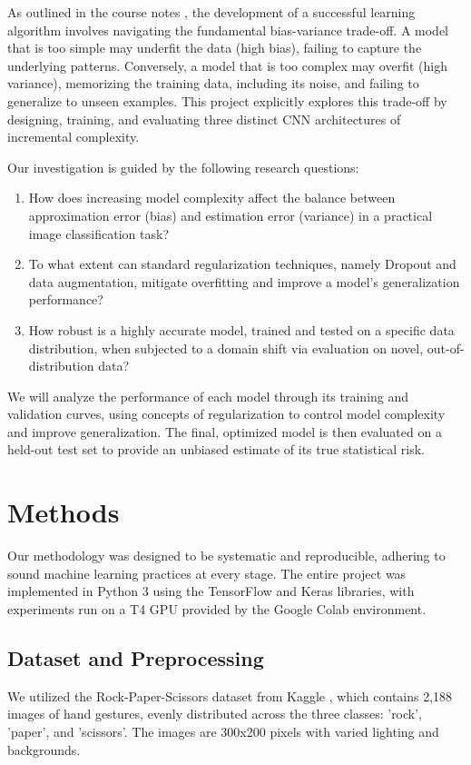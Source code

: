 \documentclass[pdflatex,sn-mathphys-num]{sn-jnl}%
\theoremstyle{thmstyleone}%
\theoremstyle{thmstyletwo}%
\theoremstyle{thmstylethree}%
\begin{document}
As outlined in the course notes \cite{cesa2024smml}, the development of a successful learning algorithm involves navigating the fundamental bias-variance trade-off. A model that is too simple may underfit the data (high bias), failing to capture the underlying patterns. Conversely, a model that is too complex may overfit (high variance), memorizing the training data, including its noise, and failing to generalize to unseen examples. This project explicitly explores this trade-off by designing, training, and evaluating three distinct CNN architectures of incremental complexity. 

Our investigation is guided by the following research questions:
\begin{enumerate}
    \item How does increasing model complexity affect the balance between approximation error (bias) and estimation error (variance) in a practical image classification task?
    \item To what extent can standard regularization techniques, namely Dropout and data augmentation, mitigate overfitting and improve a model's generalization performance?
    \item How robust is a highly accurate model, trained and tested on a specific data distribution, when subjected to a domain shift via evaluation on novel, out-of-distribution data?
\end{enumerate}

We will analyze the performance of each model through its training and validation curves, using concepts of regularization to control model complexity and improve generalization. The final, optimized model is then evaluated on a held-out test set to provide an unbiased estimate of its true statistical risk.

\section{Methods}\label{sec11}

Our methodology was designed to be systematic and reproducible, adhering to sound machine learning practices at every stage. The entire project was implemented in Python 3 using the TensorFlow and Keras libraries, with experiments run on a T4 GPU provided by the Google Colab environment.

\subsection{Dataset and Preprocessing}
We utilized the Rock-Paper-Scissors dataset from Kaggle \cite{kaggle_rps}, which contains 2,188 images of hand gestures, evenly distributed across the three classes: 'rock', 'paper', and 'scissors'. The images are 300x200 pixels with varied lighting and backgrounds.
\end{document}

